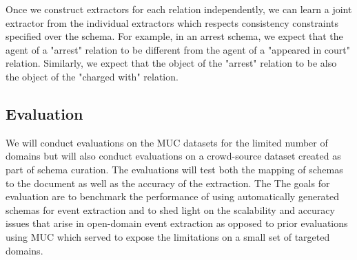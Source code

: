 Once we construct extractors for each relation independently, we can learn a joint extractor from the individual extractors which respects consistency constraints specified over the schema. For example, in an arrest schema, we expect that the agent of a "arrest" relation to be different from the agent of a "appeared in court" relation. Similarly, we expect that the object of the "arrest" relation to be also the object of the "charged with" relation. 

\subsection{Evaluation}

We will conduct evaluations on the MUC datasets for the limited number of domains but will also conduct evaluations on a crowd-source dataset created as part of schema curation. The evaluations will test both the mapping of schemas to the document as well as the accuracy of the extraction. The 
The goals for evaluation are to benchmark the performance of using automatically generated schemas for event extraction and to shed light on the scalability and accuracy issues that arise in open-domain event extraction as opposed to prior evaluations using MUC which served to expose the limitations on a small set of targeted domains. 





